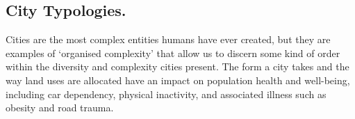\documentclass{nature}
\begin{document}






\subsection{City Typologies.}\label{sec:introduction2}
Cities are the most complex entities humans have ever created, but they are examples of `organised complexity' that allow us to discern some kind of order within the diversity and complexity cities present\cite{Kropf2014}. The form a city takes and the way land uses are allocated have an impact on population health and well-being, including car dependency, physical inactivity, and associated illness such as obesity and road trauma\cite{Giles-corti2016, Kleinert2016, Goenka2016,Zapata-Diomedi2017, Heesch2014, Daley2011, Cepeda2016, MingWen2008, Norman2006, Thompson2018b}. 
\end{document}
